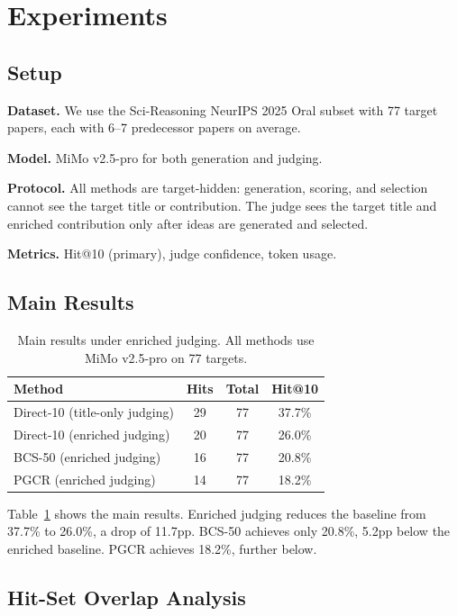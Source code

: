 \documentclass[wcp]{jmlr}
\begin{document}
\section{Experiments}\label{sec:experiments}

\subsection{Setup}

\textbf{Dataset.} We use the Sci-Reasoning NeurIPS 2025 Oral subset with 77 target papers, each with 6--7 predecessor papers on average.

\textbf{Model.} MiMo v2.5-pro for both generation and judging.

\textbf{Protocol.} All methods are target-hidden: generation, scoring, and selection cannot see the target title or contribution. The judge sees the target title and enriched contribution only after ideas are generated and selected.

\textbf{Metrics.} Hit@10 (primary), judge confidence, token usage.

\subsection{Main Results}

\begin{table}[htp]
\centering
\caption{Main results under enriched judging. All methods use MiMo v2.5-pro on 77 targets.}\label{tab:main}
\begin{tabular}{lccc}
\toprule
Method & Hits & Total & Hit@10 \\
\midrule
Direct-10 (title-only judging) & 29 & 77 & 37.7\% \\
Direct-10 (enriched judging) & 20 & 77 & 26.0\% \\
BCS-50 (enriched judging) & 16 & 77 & 20.8\% \\
PGCR (enriched judging) & 14 & 77 & 18.2\% \\
\bottomrule
\end{tabular}
\end{table}

Table~\ref{tab:main} shows the main results. Enriched judging reduces the baseline from 37.7\% to 26.0\%, a drop of 11.7pp. BCS-50 achieves only 20.8\%, 5.2pp below the enriched baseline. PGCR achieves 18.2\%, further below.

\subsection{Hit-Set Overlap Analysis}
\end{document}
